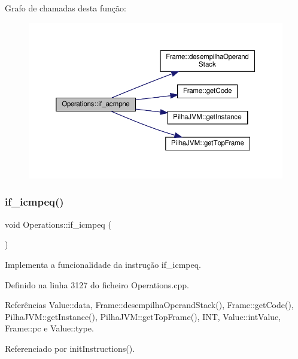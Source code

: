 Grafo de chamadas desta função\+:
\nopagebreak
\begin{figure}[H]
\begin{center}
\leavevmode
\includegraphics[width=350pt]{classOperations_a7f43bbfba9b2feb66b695d24c43dc430_cgraph}
\end{center}
\end{figure}
\mbox{\label{classOperations_a43a49ccd4f1160c0b1968af4296fa2b3}} 
\subsubsection{\texorpdfstring{if\+\_\+icmpeq()}{if\_icmpeq()}}
{\footnotesize\ttfamily void Operations\+::if\+\_\+icmpeq (\begin{DoxyParamCaption}{ }\end{DoxyParamCaption})\hspace{0.3cm}{\ttfamily [private]}}



Implementa a funcionalidade da instrução if\+\_\+icmpeq. 



Definido na linha 3127 do ficheiro Operations.\+cpp.



Referências Value\+::data, Frame\+::desempilha\+Operand\+Stack(), Frame\+::get\+Code(), Pilha\+J\+V\+M\+::get\+Instance(), Pilha\+J\+V\+M\+::get\+Top\+Frame(), I\+NT, Value\+::int\+Value, Frame\+::pc e Value\+::type.



Referenciado por init\+Instructions().

